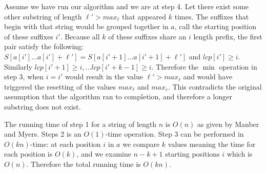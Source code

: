 \documentclass[11pt, oneside]{article}   	%
\begin{document}
Assume we have run our algorithm and we are at step 4. 
Let there exist some other substring of length $\ell'>max_\ell$ that appeared $k$ times.
The suffixes that begin with that string would be grouped together in $a$, call the starting position of these suffixes $i'$. 
Because all $k$ of these suffixes share an $i$ length prefix, the first pair satisfy the following: $S[a[i']...a[i']+\ell'] = S[a[i'+1]...a[i'+1]+\ell']$ and $lcp[i']\ge i$. 
Similarly $lcp[i'+1]\ge i, ... lcp[i'+k-1]\ge i$. 
Therefore the $\min$ operation in step 3, when $i=i'$ would result in the value $\ell' > max_\ell$ and would have triggered the resetting of the values $max_\ell$ and $max_c$. 
This contradicts the original assumption that the algorithm ran to completion, and therefore a longer substring does not exist. 

The running time of step 1 for a string of length $n$ is $O(n)$ as given by Manber and Myers. 
Steps 2 is an $O(1)$-time operation. 
Step 3 can be performed in $O(kn)$-time: at each position $i$ in $a$ we compare $k$ values meaning the time for each position is $O(k)$, and we examine $n-k+1$ starting positions $i$ which is $O(n)$.
Therefore the total running time is $O(kn)$.
\end{document}
